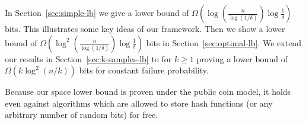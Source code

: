 In Section~\ref{sec:simple-lb} we give a lower bound of $\Omega(\log(\frac n{\log(1/\delta)}) \log \frac{1}{\delta})$ bits. This illustrates some key ideas of our framework. Then we show a lower bound of $\Omega(\log^2(\frac n{\log(1/\delta)}) \log \frac{1}{\delta})$ bits in Section~\ref{sec:optimal-lb}.
We extend our results in Section~\ref{sec:k-samples-lb} to  for $k\ge 1$ proving a lower bound of $\Omega(k\log^2(n/k))$ bits for constant failure probability.

\begin{remark}
\textup{
  Because our space lower bound is proven under the public coin model, it holds even against algorithms which are allowed to store hash functions (or any arbitrary number of random bits) for free.
}
\end{remark}